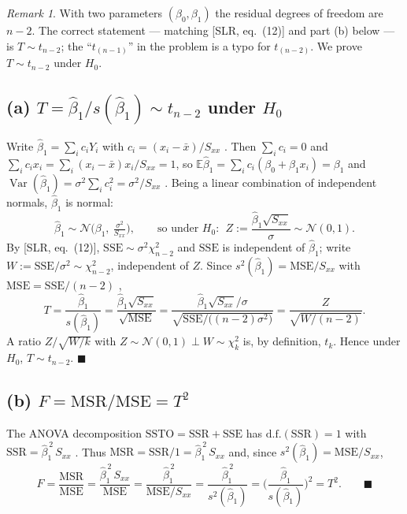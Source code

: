 \documentclass[11pt]{article}
\DeclareMathOperator{\Var}{Var}
\newcommand{\E}{\mathbb{E}}
\newcommand{\N}{\mathcal{N}}
\newcommand{\Sxx}{S_{xx}}
\newcommand{\bhat}[1]{\widehat{#1}}
\theoremstyle{remark}
\newtheorem*{remark}{Remark}
\begin{document}
\begin{remark}
With two parameters $(\beta_0,\beta_1)$ the residual degrees of freedom are $n-2$. The correct statement ---
matching [SLR, eq.~(12)] and part (b) below --- is $T\sim t_{n-2}$; the ``$t_{(n-1)}$'' in the problem is a
typo for $t_{(n-2)}$. We prove $T\sim t_{n-2}$ under $H_0$.
\end{remark}

\subsection*{(a) $T=\bhat\beta_1/s(\bhat\beta_1)\sim t_{n-2}$ under $H_0$}

Write $\bhat\beta_1=\sum_i c_iY_i$ with $c_i=(x_i-\bar x)/\Sxx$ \;[SLR, eq.~(4)]. Then
$\sum_i c_i=0$ and $\sum_i c_ix_i=\sum_i(x_i-\bar x)x_i/\Sxx=1$, so
$\E\bhat\beta_1=\sum_i c_i(\beta_0+\beta_1x_i)=\beta_1$ and
$\Var(\bhat\beta_1)=\sigma^2\sum_i c_i^2=\sigma^2/\Sxx$ \;[SLR, eq.~(7)]. Being a linear combination of
independent normals, $\bhat\beta_1$ is normal:
\[
\bhat\beta_1\sim\N\!\Big(\beta_1,\ \tfrac{\sigma^2}{\Sxx}\Big),
\qquad\text{so under }H_0:\ \ Z:=\frac{\bhat\beta_1\sqrt{\Sxx}}{\sigma}\sim\N(0,1).
\]
By [SLR, eq.~(12)], $\mathrm{SSE}\sim\sigma^2\chi^2_{n-2}$ and $\mathrm{SSE}$ is independent of $\bhat\beta_1$;
write $W:=\mathrm{SSE}/\sigma^2\sim\chi^2_{n-2}$, independent of $Z$. Since $s^2(\bhat\beta_1)=\mathrm{MSE}/\Sxx$
with $\mathrm{MSE}=\mathrm{SSE}/(n-2)$ \;[SLR, eq.~(8)],
\[
T=\frac{\bhat\beta_1}{s(\bhat\beta_1)}
=\frac{\bhat\beta_1\sqrt{\Sxx}}{\sqrt{\mathrm{MSE}}}
=\frac{\bhat\beta_1\sqrt{\Sxx}/\sigma}{\sqrt{\mathrm{SSE}/\big((n-2)\sigma^2\big)}}
=\frac{Z}{\sqrt{W/(n-2)}}.
\]
A ratio $Z/\sqrt{W/k}$ with $Z\sim\N(0,1)\perp W\sim\chi^2_k$ is, by definition, $t_k$. Hence under $H_0$,
$T\sim t_{n-2}$. \hfill$\blacksquare$

\subsection*{(b) $F=\mathrm{MSR}/\mathrm{MSE}=T^2$}

The ANOVA decomposition $\mathrm{SSTO}=\mathrm{SSR}+\mathrm{SSE}$ has $\mathrm{d.f.}(\mathrm{SSR})=1$ with
$\mathrm{SSR}=\bhat\beta_1^{\,2}\,\Sxx$ . Thus
$\mathrm{MSR}=\mathrm{SSR}/1=\bhat\beta_1^{\,2}\,\Sxx$ and, since $s^2(\bhat\beta_1)=\mathrm{MSE}/\Sxx$,
\[
F=\frac{\mathrm{MSR}}{\mathrm{MSE}}=\frac{\bhat\beta_1^{\,2}\,\Sxx}{\mathrm{MSE}}
=\frac{\bhat\beta_1^{\,2}}{\mathrm{MSE}/\Sxx}
=\frac{\bhat\beta_1^{\,2}}{s^2(\bhat\beta_1)}
=\Big(\frac{\bhat\beta_1}{s(\bhat\beta_1)}\Big)^{2}=T^2. \qquad\blacksquare
\]
\end{document}
